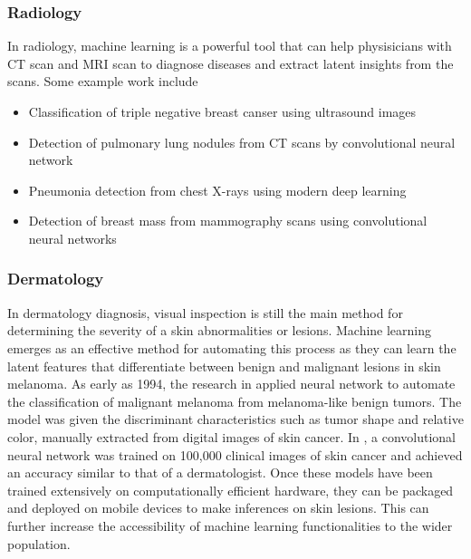 \documentclass{article}
\begin{document}
\subsubsection{Radiology}
In radiology, machine learning is a powerful tool that can help physisicians with CT scan and MRI scan to diagnose diseases and extract latent insights from the scans. Some example work include
\begin{itemize}
    \item Classification of triple negative breast canser using ultrasound images \cite{wu_machine_2019}
    \item Detection of pulmonary lung nodules from CT scans by convolutional neural network \cite{van_ginneken_off--shelf_2015}
    \item Pneumonia detection from chest X-rays using modern deep learning \cite{rajpurkar_chexnet_2017}
    \item Detection of breast mass from mammography scans using convolutional neural networks \cite{arevalo_convolutional_2015}
\end{itemize} 



\subsubsection{Dermatology}
In dermatology diagnosis, visual inspection is still the main method for determining the severity of a skin abnormalities or lesions. 
Machine learning emerges as an effective method for automating this process as they can learn the latent features that differentiate between benign and malignant lesions in skin melanoma. 
As early as 1994, the research in \cite{ercal_neural_1994} applied neural network to automate the classification of malignant melanoma from melanoma-like benign tumors.
The model was given the discriminant characteristics such as tumor shape and relative color, manually extracted from digital images of skin cancer.
In \cite{esteva_dermatologist-level_2017}, a convolutional neural network was trained on 100,000 clinical images of skin cancer and achieved an accuracy similar to that of a dermatologist.
Once these models have been trained extensively on computationally efficient hardware, they can be packaged and deployed on mobile devices to make inferences on skin lesions. 
This can further increase the accessibility of machine learning functionalities to the wider population.
\end{document}
